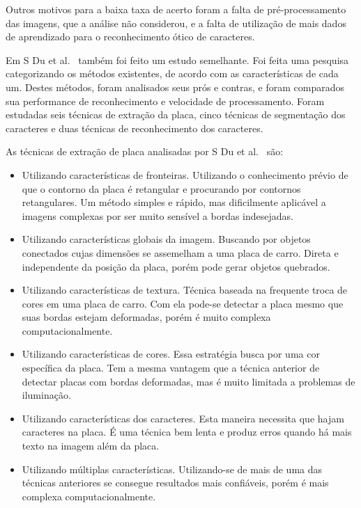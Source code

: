 Outros motivos para a baixa taxa de acerto foram a falta de pré-processamento
das imagens, que a análise não considerou, e a falta de utilização de mais dados de
aprendizado para o reconhecimento ótico de caracteres.

Em S Du et al.~\cite{s2013automatic} também foi feito um estudo semelhante. Foi feita uma pesquisa categorizando os métodos existentes, de acordo com as características de cada um. Destes métodos, foram analisados seus prós e contras, e foram comparados sua performance de reconhecimento e velocidade de processamento. Foram estudadas seis técnicas de extração da placa, cinco técnicas de segmentação dos caracteres e duas técnicas de reconhecimento dos caracteres.

As técnicas de extração de placa analisadas por S Du et al.~\cite{s2013automatic} são:

\begin{itemize}
	\item Utilizando características de fronteiras. Utilizando o conhecimento prévio de que o contorno da placa é retangular e procurando por contornos retangulares. Um método simples e rápido, mas dificilmente aplicável a imagens complexas por ser muito sensível a bordas indesejadas.
    \item Utilizando características globais da imagem. Buscando por objetos conectados cujas dimensões se assemelham a uma placa de carro. Direta e independente da posição da placa, porém pode gerar objetos quebrados.
    \item Utilizando características de textura. Técnica baseada na frequente troca de cores em uma placa de carro. Com ela pode-se detectar a placa mesmo que suas bordas estejam deformadas, porém é muito complexa computacionalmente.
    \item Utilizando características de cores. Essa estratégia busca por uma cor específica da placa. Tem a mesma vantagem que a técnica anterior de detectar placas com bordas deformadas, mas é muito limitada a problemas de iluminação.
	\item Utilizando características dos caracteres. Esta maneira necessita que hajam caracteres na placa. É uma técnica bem lenta e produz erros quando há mais texto na imagem além da placa.
    \item Utilizando múltiplas características. Utilizando-se de mais de uma das técnicas anteriores se consegue resultados mais confiáveis, porém é mais complexa computacionalmente.
\end{itemize}

